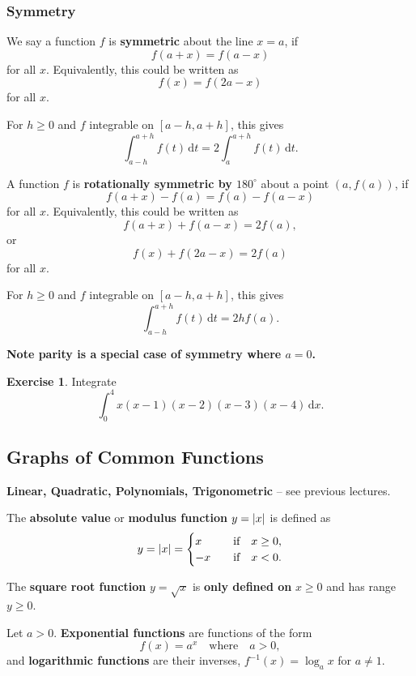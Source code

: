 \documentclass[11pt]{article}
\theoremstyle{definition}
\newtheorem{example}[theorem]{Exercise}
\theoremstyle{remark}
\newcommand{\pqty}[1]{\left(#1\right)}
\DeclarePairedDelimiter{\abs}{\lvert}{\rvert}
\newcommand{\degree}{^{\circ}}
\newcommand{\inverse}{^{-1}}
\newcommand{\qif}{\quad\text{if}\quad}
\newcommand{\qqtext}[1]{\quad\text{#1}\quad}
\newcommand{\dd}[1]{\,\mathrm{d}#1}
\begin{document}
\subsubsection{Symmetry}\label{tmua-5-subsubsection-004}

We say a function \(f\) is \textbf{symmetric} about the line \(x = a\), if
\[
    f\pqty{a + x} = f\pqty{a - x}
\]  
for all \(x\). Equivalently, this could be written as
\[
    f\pqty{x} = f\pqty{2a - x}
\]
for all \(x\).

For \(h\ge0\) and \(f\) integrable on \([a-h,a+h]\), this gives
\[
    \int_{a-h}^{a+h} f(t)\,\mathrm{d}t = 2\int_a^{a+h} f(t)\,\mathrm{d}t.
\]

A function \(f\) is \textbf{rotationally symmetric by \(180 \degree\)} about a point \(\pqty{a, f\pqty{a}}\), if
\[
    f\pqty{a + x} - f\pqty{a} = f\pqty{a} - f\pqty{a - x}
\]
for all \(x\). Equivalently, this could be written as
\[
    f\pqty{a + x} + f\pqty{a - x} = 2 f\pqty{a},
\]
or
\[
    f\pqty{x} + f\pqty{2a - x} = 2 f\pqty{a}
\]
for all \(x\).

For \(h\ge0\) and \(f\) integrable on \([a-h,a+h]\), this gives
\[
    \int_{a-h}^{a+h} f(t)\,\mathrm{d}t = 2h f(a).
\]

\textbf{Note parity is a special case of symmetry where \(a = 0\).}

\begin{example}\label{tmua-5-unit-008}
    Integrate
    \[
        \int_{0}^{4} x \pqty{x - 1} \pqty{x - 2} \pqty{x - 3} \pqty{x - 4} \dd{x}.
    \]
\end{example}

\subsection{Graphs of Common Functions}\label{tmua-5-subsection-003}

\textbf{Linear, Quadratic, Polynomials, Trigonometric} -- see previous lectures.

The \textbf{absolute value} or \textbf{modulus function} \(y = \abs{x}\) is defined as
\[
    y = \abs{x} = \begin{cases}
        x & \qif x \geq 0, \\
        -x & \qif x < 0.
    \end{cases}
\]

The \textbf{square root function} \(y = \sqrt{x}\) is \textbf{only defined on} \(x \geq 0\) and has range \(y \geq 0\).

Let \(a > 0\). \textbf{Exponential functions} are functions of the form
\[
    f\pqty{x} = a^x \qqtext{where} a > 0,
\]
and \textbf{logarithmic functions} are their inverses, \(f\inverse\pqty{x} = \log_a x\) for \(a \neq 1\).
\end{document}
